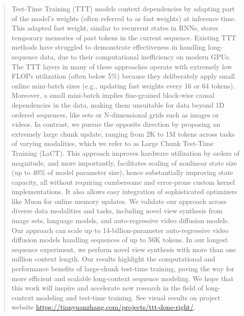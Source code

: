 
\begin{abstract}

Test-Time Training (TTT) models context dependencies by adapting part of the model's weights (often referred to as fast weights) at inference time. This adapted fast weight, similar to recurrent states in RNNs, stores temporary memories of past tokens in the current sequence. Existing TTT methods have struggled to demonstrate effectiveness in handling long-sequence data, due to their computational inefficiency on modern GPUs. The TTT layers in
many of these approaches operate with extremely low FLOPs utilization (often below 5\%) because they deliberately apply small online mini-batch sizes (e.g., updating fast weights every 16 or 64 tokens).
Moreover, a small mini-batch implies fine-grained block-wise causal dependencies in the data, making them unsuitable for data beyond 1D ordered sequences, like sets or N-dimensional grids such as images or videos.
In contrast, we pursue the opposite direction by proposing an extremely large chunk update, ranging from 2K to 1M tokens across tasks of varying modalities, which we refer to as Large Chunk Test-Time Training (LaCT). 
This approach improves hardware utilization by orders of magnitude, and more importantly, facilitates scaling of nonlinear state size (up to 40\% of model parameter size), hence
substantially improving state capacity, all without requiring cumbersome and error-prone custom kernel implementations.
It also allows easy integration of sophisticated optimizers like Muon for online memory updates.
We validate our approach across diverse data modalities and tasks, including novel view synthesis from image sets, language models, and auto-regressive video diffusion models. 
Our approach can scale up to 14-billion-parameter auto-regressive video diffusion models handling sequences of up to 56K tokens. 
In our longest sequence experiment, we perform novel view synthesis with more than one million context length. Our results highlight the computational and performance benefits of large-chunk test-time training, paving the way for more efficient and scalable long-context sequence modeling. We hope that this work will inspire and accelerate new research in the field of long-context modeling and test-time training.  See visual results on project website \url{https://tianyuanzhang.com/projects/ttt-done-right/}.


\end{abstract}